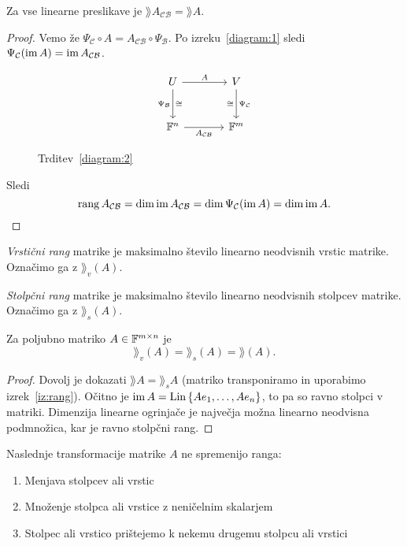 \documentclass[12pt, a4paper]{article}
\begin{document}
\begin{trditev}\label{diagram:2}
Za vse linearne preslikave je $\rang A_{\mathcal{CB}}=\rang A$.
\end{trditev}

\begin{proof}
Vemo že $\Psi_{\mathcal{C}}\circ A=A_{\mathcal{CB}}\circ\Psi_{\mathcal{B}}$. Po izreku~\ref{diagram:1} sledi $\Psi_{\mathcal{C}}(\operatorname{im} A)=\operatorname{im} A_{\mathcal{CB}}$.

\begin{figure}[H]
\[
\begin{tikzcd}[column sep=large, row sep=large]
U
\arrow[r, "A"]
\arrow[d, "\Psi_{\mathcal{B}}"', "\cong"] & V \arrow[d, "\Psi_{\mathcal{C}}", "\cong"'] \\
\F^n \arrow[r, "A_{\mathcal{CB}}"'] & \F^m
\end{tikzcd}
\]
\caption{Trditev~\ref{diagram:2}}
\end{figure}

Sledi
\[
\operatorname{rang} A_{\mathcal{CB}}=\dim\operatorname{im} A_{\mathcal{CB}}=\dim \Psi_{\mathcal{C}}(\operatorname{im} A)=\dim\operatorname{im} A.\qedhere
\]
\end{proof}

\begin{definicija}
\emph{Vrstični rang} matrike je maksimalno število linearno neodvisnih vrstic matrike. Označimo ga z $\rang_v(A)$.

\emph{Stolpčni rang} matrike je maksimalno število linearno neodvisnih stolpcev matrike. Označimo ga z $\rang_s(A)$.
\end{definicija}

\begin{izrek}
Za poljubno matriko $A\in\mathbb{F}^{m\times n}$ je
\[
\rang_v(A)=\rang_s(A)=\rang(A).
\]
\end{izrek}

\begin{proof}
Dovolj je dokazati $\rang A=\rang_s A$ (matriko transponiramo in uporabimo izrek~\ref{iz:rang}). Očitno je $\operatorname{im} A=\operatorname{Lin}\left\{Ae_1,\dots,Ae_n\right\}$, to pa so ravno stolpci v matriki. Dimenzija linearne ogrinjače je največja možna linearno neodvisna podmnožica, kar je ravno stolpčni rang.
\end{proof}

Naslednje transformacije matrike $A$ ne spremenijo ranga:

\begin{enumerate}[label=\arabic*)]
\item Menjava stolpcev ali vrstic
\item Množenje stolpca ali vrstice z neničelnim skalarjem
\item Stolpec ali vrstico prištejemo k nekemu drugemu stolpcu ali vrstici
\end{enumerate}
\end{document}
